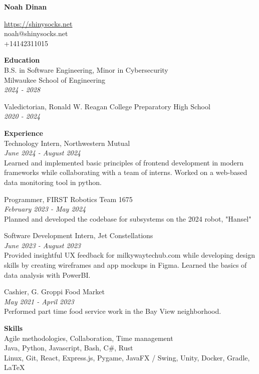 \documentclass[10pt]{article}
\begin{document}
{\fontsize{19pt}{0pt}\selectfont \textbf{Noah Dinan}}

\href{https://shinysocks.net}{https://shinysocks.net}\\
noah@shinysocks.net\\
+14142311015

{\fontsize{11pt}{0pt}\selectfont \textbf{Education}}\\
B.S. in Software Engineering, Minor in Cybersecurity\\
Milwaukee School of Engineering\\
\textit{2024 - 2028}

Valedictorian, Ronald W. Reagan College Preparatory High School\\
\textit{2020 - 2024}

{\fontsize{11pt}{0pt}\selectfont \textbf{Experience}}\\
Technology Intern, Northwestern Mutual\\
\textit{June 2024 - August 2024}\\
Learned and implemented basic principles of frontend development in modern frameworks while
collaborating with a team of interns. Worked on a web-based data monitoring tool in python.

Programmer, FIRST Robotics Team 1675\\
\textit{February 2023 - May 2024}\\
Planned and developed the codebase for subsystems on the 2024 robot, "Hansel"

Software Development Intern, Jet Constellations\\
\textit{June 2023 - August 2023}\\
Provided insightful UX feedback for milkywaytechub.com while developing design skills by
creating wireframes and app mockups in Figma. Learned the basics of data analysis with PowerBI.

Cashier, G. Groppi Food Market\\
\textit{May 2021 - April 2023}\\
Performed part time food service work in the Bay View neighborhood.

{\fontsize{11pt}{0pt}\selectfont \textbf{Skills}}\\
Agile methodologies, Collaboration, Time management\\
Java, Python, Javascript, Bash, C\#, Rust\\
Linux, Git, React, Express.js, Pygame, JavaFX / Swing, Unity, Docker, Gradle, LaTeX
\end{document}
